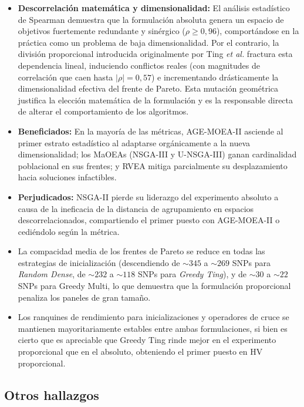 \begin{itemize}
    \item \textbf{Descorrelación matemática y dimensionalidad:} El análisis estadístico de Spearman demuestra que la formulación absoluta genera un espacio de objetivos fuertemente redundante y sinérgico ($\rho \geq 0{,}96$), comportándose en la práctica como un problema de baja dimensionalidad. Por el contrario, la división proporcional introducida originalmente por Ting \textit{et al.} fractura esta dependencia lineal, induciendo conflictos reales (con magnitudes de correlación que caen hasta $|\rho| = 0{,}57$) e incrementando drásticamente la dimensionalidad efectiva del frente de Pareto. Esta mutación geométrica justifica la elección matemática de la formulación y es la responsable directa de alterar el comportamiento de los algoritmos.
    \item \textbf{Beneficiados:} En la mayoría de las métricas, AGE-MOEA-II asciende al primer estrato estadístico al adaptarse orgánicamente a la nueva dimensionalidad; los MaOEAs (NSGA-III y U-NSGA-III) ganan cardinalidad poblacional en sus frentes; y RVEA mitiga parcialmente su desplazamiento hacia soluciones infactibles.
    \item \textbf{Perjudicados:} NSGA-II pierde su liderazgo del experimento absoluto a causa de la ineficacia de la distancia de agrupamiento en espacios descorrelacionados, compartiendo el primer puesto con AGE-MOEA-II o cediéndolo según la métrica.
    \item La compacidad media de los frentes de Pareto se reduce en todas las estrategias de inicialización (descendiendo de $\sim 345$ a $\sim 269$ SNPs para \textit{Random Dense}, de $\sim 232$ a $\sim 118$ SNPs para \textit{Greedy Ting}), y de $\sim 30$ a $\sim 22$ SNPs para Greedy Multi, lo que demuestra que la formulación proporcional penaliza los paneles de gran tamaño.
    \item Los ranquines de rendimiento para inicializaciones y operadores de cruce se mantienen mayoritariamente estables entre ambas formulaciones, si bien es cierto que es apreciable que Greedy Ting rinde mejor en el experimento proporcional que en el absoluto, obteniendo el primer puesto en HV proporcional.
\end{itemize}

\subsection{Otros hallazgos}

